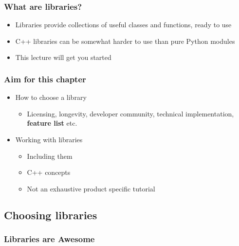 \subsubsection{What are libraries?}\label{what-are-libraries}

\begin{itemize}
\itemsep1pt\parskip0pt
\item
  Libraries provide collections of useful classes and functions, ready
  to use
\item
  C++ libraries can be somewhat harder to use than pure Python modules
\item
  This lecture will get you started
\end{itemize}

\subsubsection{Aim for this chapter}\label{aim-for-this-chapter}

\begin{itemize}
\itemsep1pt\parskip0pt
\item
  How to choose a library

  \begin{itemize}
  \itemsep1pt\parskip0pt
  \item
    Licensing, longevity, developer community, technical implementation,
    \textbf{feature list} etc.
  \end{itemize}
\item
  Working with libraries

  \begin{itemize}
  \itemsep1pt\parskip0pt
  \item
    Including them
  \item
    C++ concepts
  \item
    Not an exhaustive product specific tutorial
  \end{itemize}
\end{itemize}

\subsection{Choosing libraries}\label{choosing-libraries}

\subsubsection{Libraries are Awesome}\label{libraries-are-awesome}

